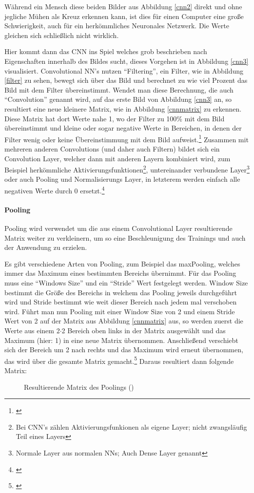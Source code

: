 Während ein Mensch diese beiden Bilder aus Abbildung \ref{cnn2} direkt und ohne jegliche Mühen als Kreuz erkennen kann, ist dies für einen Computer eine große Schwierigkeit, auch für ein herkömmliches Neuronales Netzwerk. Die Werte gleichen sich schließlich nicht wirklich.

Hier kommt dann das CNN ins Spiel welches grob beschrieben nach Eigenschaften innerhalb des Bildes sucht, dieses Vorgehen ist in Abbildung \ref{cnn3} visualisiert. Convolutional NN's nutzen "`Filtering"', ein Filter, wie in Abbildung \ref{filter} zu sehen, bewegt sich über das Bild und berechnet zu wie viel Prozent das Bild mit dem Filter übereinstimmt. Wendet man diese Berechnung, die auch "`Convolution"' genannt wird, auf das erste Bild von Abbildung \ref{cnn3} an, so resultiert eine neue kleinere Matrix, wie in Abbildung \ref{cnnmatrix} zu erkennen. Diese Matrix hat dort Werte nahe 1, wo der Filter zu 100\% mit dem Bild übereinstimmt und kleine oder sogar negative Werte in Bereichen, in denen der Filter wenig oder keine Übereinstimmung mit dem Bild aufweist.\footnote{\cite{cnnexplanation}} Zusammen mit mehreren anderen Convolutions (und daher auch Filtern) bildet sich ein Convolution Layer, welcher dann mit anderen Layern kombiniert wird, zum Beispiel herkömmliche Aktivierungsfunktionen\footnote{Bei CNN's zählen Aktivierungsfunkionen als eigene Layer; nicht zwangsläufig Teil eines Layers}, untereinander verbundene Layer\footnote{Normale Layer aus normalen NNs; Auch Dense Layer genannt} oder auch Pooling und Normalisierungs Layer, in letzterem werden einfach alle negativen Werte durch 0 ersetzt.\footnote{\cite{cnnexplanation}}

\paragraph{Pooling}

Pooling wird verwendet um die aus einem Convolutional Layer resultierende Matrix weiter zu verkleinern, um so eine Beschleunigung des Trainings und auch der Anwendung zu erzielen.

Es gibt verschiedene Arten von Pooling, zum Beispiel das maxPooling, welches immer das Maximum eines bestimmten Bereichs übernimmt. Für das Pooling muss eine "`Windows Size"' und ein "`Stride"' Wert festgelegt werden. Window Size bestimmt die Größe des Bereichs in welchem das Pooling jeweils durchgeführt wird und Stride bestimmt wie weit dieser Bereich nach jedem mal verschoben wird.
Führt man nun Pooling mit einer Window Size von 2 und einem Stride Wert von 2 auf der Matrix aus Abbildung \ref{cnnmatrix} aus, so werden zuerst die Werte aus einem 2$\cdot$2 Bereich oben links in der Matrix ausgewählt und das Maximum (hier: 1) in eine neue Matrix übernommen. Anschließend verschiebt sich der Bereich um 2 nach rechts und das Maximum wird erneut übernommen, das wird über die gesamte Matrix gemacht.\footnote{\cite{cnnexplanation}} Daraus resultiert dann folgende Matrix:

\begin{figure}[H]
    \caption[poolingmatrix]{Resultierende Matrix des Poolings (\cite{cnnexplanation})}
    \label{poolingmatrix}
\end{figure}